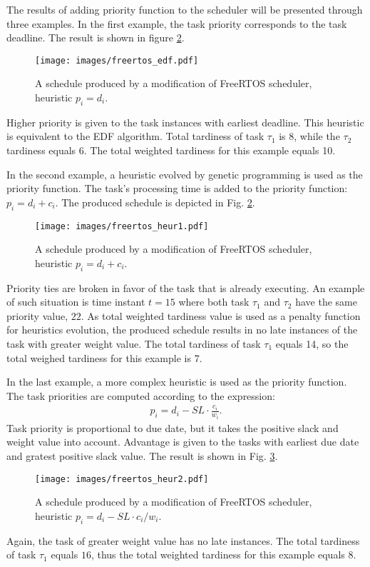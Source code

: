 The results of adding priority function to the scheduler will be presented through three examples.
In the first example, the task priority corresponds to the task deadline.
The result is shown in figure \ref{freertos_1}. 
\begin{figure}[ht]
    \centering
    \texttt{[image: images/freertos\_edf.pdf]}
    \caption{A schedule produced by a modification of FreeRTOS scheduler, heuristic $p_i = d_i$.}
    \label{freertos_edf}
\end{figure}
Higher priority is given to the task instances with earliest deadline.
This heuristic is equivalent to the EDF algorithm.
Total tardiness of task $\tau_1$ is 8, while the $\tau_2$ tardiness equals 6.
The total weighted tardiness for this example equals 10.

In the second example, a heuristic evolved by genetic programming is used as the priority function.
The task's processing time is added to the priority function: $p_i = d_i + c_i$.
The produced schedule is depicted in Fig. \ref{freertos_1}.
\begin{figure}[ht]
    \centering
    \texttt{[image: images/freertos\_heur1.pdf]}
    \caption{A schedule produced by a modification of FreeRTOS scheduler, heuristic $p_i = d_i + c_i$.}
    \label{freertos_1}
\end{figure}
Priority ties are broken in favor of the task that is already executing.
An example of such situation is time instant $t=15$ where both task $\tau_1$ and $\tau_2$ have the same priority value, $22$.
As total weighted tardiness value is used as a penalty function for heuristics evolution, the produced schedule results in no late instances of the task with greater weight value.
The total tardiness of task $\tau_1$ equals 14, so the total weighed tardiness for this example is 7.

In the last example, a more complex heuristic is used as the priority function.
The task priorities are computed according to the expression:
\begin{align*}
p_i = d_i - SL \cdot \frac{c_i}{w_i}.
\end{align*}
Task priority is proportional to due date, but it takes the positive slack and weight value into account.
Advantage is given to the tasks with earliest due date and gratest positive slack value.
The result is shown in Fig. \ref{freertos_2}.
\begin{figure}[ht]
    \centering
    \texttt{[image: images/freertos\_heur2.pdf]}
    \caption{A schedule produced by a modification of FreeRTOS scheduler, heuristic $p_i = d_i - SL \cdot c_i / w_i$.}
    \label{freertos_2}
\end{figure}
Again, the task of greater weight value has no late instances.
The total tardiness of task $\tau_1$ equals $16$, thus the total weighted tardiness for this example equals $8$.